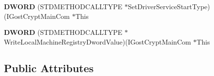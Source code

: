 \begin{DoxyCompactItemize}
\item 
\mbox{\label{struct_i_gost_crypt_main_com_vtbl_a3df4c2dfd940cae37433577190285a35}} 
{\bfseries D\+W\+O\+RD} (S\+T\+D\+M\+E\+T\+H\+O\+D\+C\+A\+L\+L\+T\+Y\+PE $\ast$Set\+Driver\+Service\+Start\+Type)(I\+Gost\+Crypt\+Main\+Com $\ast$This
\item 
\mbox{\label{struct_i_gost_crypt_main_com_vtbl_a8dd2a771f5718f8965a632dd3941142a}} 
{\bfseries D\+W\+O\+RD} (S\+T\+D\+M\+E\+T\+H\+O\+D\+C\+A\+L\+L\+T\+Y\+PE $\ast$Write\+Local\+Machine\+Registry\+Dword\+Value)(I\+Gost\+Crypt\+Main\+Com $\ast$This
\end{DoxyCompactItemize}
\subsection*{Public Attributes}
